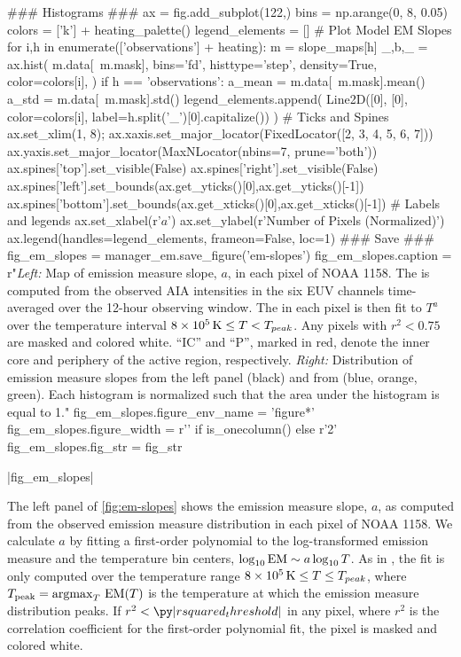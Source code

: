 \begin{pycode}[manager_em]
### Histograms ###
ax = fig.add_subplot(122,)
bins = np.arange(0, 8, 0.05)
colors = ['k'] + heating_palette()
legend_elements = []
# Plot Model EM Slopes
for i,h in enumerate(['observations'] + heating):
    m = slope_maps[h]
    _,b,_ = ax.hist(
        m.data[~m.mask],
        bins='fd',
        histtype='step',
        density=True,
        color=colors[i],
    )
    if h == 'observations':
        a_mean = m.data[~m.mask].mean()
        a_std = m.data[~m.mask].std()
    legend_elements.append(
        Line2D([0], [0], color=colors[i], label=h.split('_')[0].capitalize())
    )
# Ticks and Spines
ax.set_xlim(1, 8);
ax.xaxis.set_major_locator(FixedLocator([2, 3, 4, 5, 6, 7]))
ax.yaxis.set_major_locator(MaxNLocator(nbins=7, prune='both'))
ax.spines['top'].set_visible(False)
ax.spines['right'].set_visible(False)
ax.spines['left'].set_bounds(ax.get_yticks()[0],ax.get_yticks()[-1])
ax.spines['bottom'].set_bounds(ax.get_xticks()[0],ax.get_xticks()[-1])
# Labels and legends
ax.set_xlabel(r'$a$')
ax.set_ylabel(r'Number of Pixels (Normalized)')
ax.legend(handles=legend_elements, frameon=False, loc=1)
### Save ###
fig_em_slopes = manager_em.save_figure('em-slopes')
fig_em_slopes.caption = r"\textit{Left:} Map of emission measure slope, $a$, in each pixel of \AR{} NOAA 1158. The \dem{} is computed from the observed AIA intensities in the six EUV channels time-averaged over the 12-hour observing window. The \dem{} in each pixel is then fit to $T^a$ over the temperature interval $8\times10^5\,\textup{K}\le T < T_{peak}$. Any pixels with $r^2<0.75$ are masked and colored white. ``IC'' and ``P'', marked in red, denote the inner core and periphery of the active region, respectively. \textit{Right:} Distribution of emission measure slopes from the left panel (black) and from  (blue, orange, green). Each histogram is normalized such that the area under the histogram is equal to 1."
fig_em_slopes.figure_env_name = 'figure*'
fig_em_slopes.figure_width = r'\columnwidth' if is_onecolumn() else r'2\columnwidth'
fig_em_slopes.fig_str = fig_str
\end{pycode}
\py[manager_em]|fig_em_slopes|

The left panel of \autoref{fig:em-slopes} shows the emission measure slope, $a$, as computed from the observed emission measure distribution in each pixel of \AR{} NOAA 1158.
We calculate $a$ by fitting a first-order polynomial to the log-transformed emission measure and the temperature bin centers, $\log_{10}\textup{EM}\sim a\log_{10}T$.
As in , the fit is only computed over the temperature range $8\times10^5\,\textup{K}\le T \le T_{peak}$, where $T_\textup{peak}=\operatorname*{argmax}_T\,\textup{EM}(T)$ is the temperature at which the emission measure distribution peaks.
If $r^2<\py|rsquared_threshold|$ in any pixel, where $r^2$ is the correlation coefficient for the first-order polynomial fit, the pixel is masked and colored white. 

